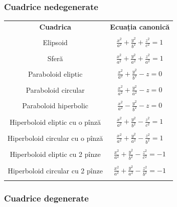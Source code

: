 \documentclass[11pt,a4paper]{article}
\theoremstyle{dotless}
\theoremstyle{dotlessdr}
\begin{document}

\subsubsection{Cuadrice nedegenerate}
\label{subsec:cuadrice-nedeg}

\begin{center}
  \begin{tabular}{| c | c |}
    \hline
    \textbf{Cuadrica} & \textbf{Ecuația canonică} \\ & \\
    Elipsoid & $\frac{x^2}{a^2} + \frac{y^2}{b^2} + \frac{z^2}{c^2} = 1$ \\ & \\
    Sferă & $\frac{x^2}{a^2} + \frac{y^2}{a^2} + \frac{z^2}{a^2} = 1$ \\ & \\
    Paraboloid eliptic & $\frac{x^2}{a^2} + \frac{y^2}{b^2} - z = 0$ \\ & \\
    Paraboloid circular & $\frac{x^2}{a^2} + \frac{y^2}{a^2} - z = 0$ \\ & \\
    Paraboloid hiperbolic & $\frac{x^2}{a^2} - \frac{y^2}{b^2} - z = 0$ \\ & \\
    Hiperboloid eliptic cu o pînză & $\frac{x^2}{a^2} + \frac{y^2}{b^2} - \frac{z^2}{c^2} = 1$ \\ & \\
    Hiperboloid circular cu o pînză & $\frac{x^2}{a^2} + \frac{y^2}{a^2} - \frac{z^2}{b^2} = 1$ \\ & \\
    Hiperboloid eliptic cu 2 pînze & $\frac{x^2}{a^2} + \frac{y^2}{b^2} - \frac{z^2}{c^2} = -1$ \\ & \\
    Hiperboloid circular cu 2 pînze & $\frac{x^2}{a^2} + \frac{y^2}{a^2} - \frac{z^2}{b^2} = -1$ \\ & \\
    \hline
  \end{tabular}
\end{center}



\subsubsection{Cuadrice degenerate}
\label{subsec:cuadrice-deg}
\end{document}
